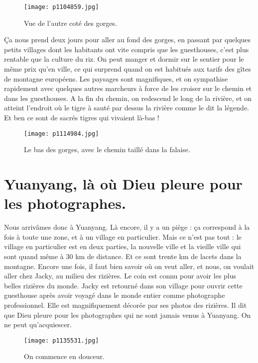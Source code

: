 \documentclass{book}
\begin{document}
\begin{figure}[h]
\centering
\texttt{[image: p1104859.jpg]}
\caption*{Vue de l'autre coté des gorges.}
\end{figure}

Ça nous prend deux jours pour aller au fond des gorges, en passant par quelques petits villages dont les habitants ont vite compris que les guesthouses, c'est plus rentable que la culture du riz. On peut manger et dormir sur le sentier pour le même prix qu'en ville, ce qui surprend quand on est habitués aux tarifs des gîtes de montagne européens. Les paysages sont magnifiques, et on sympathise rapidement avec quelques autres marcheurs à force de les croiser sur le chemin et dans les guesthouses.
A la fin du chemin, on redescend le long de la rivière, et on atteint l'endroit où le tigre à sauté par dessus la rivière comme le dit la légende. Et ben ce sont de sacrés tigres qui vivaient là-bas !


\begin{figure}[h]
\centering
\texttt{[image: p1114984.jpg]}
\caption*{Le bas des gorges, avec le chemin taillé dans la falaise.}
\end{figure}



\chapter{Yuanyang, là où Dieu pleure pour les photographes.}
Nous arrivâmes donc à Yuanyang. Là encore, il y a un piège : ça correspond à la fois à toute une zone, et à un village en particulier. Mais ce n'est pas tout : le village en particulier est en deux parties, la nouvelle ville et la vieille ville qui sont quand même à 30 km de distance. Et ce sont trente km de lacets dans la montagne. Encore une fois, il faut bien savoir où on veut aller, et nous, on voulait aller chez Jacky, au milieu des rizières. Le coin est connu pour avoir les plus belles rizières du monde. Jacky est retourné dans son village pour ouvrir cette guesthouse après avoir voyagé dans le monde entier comme photographe professionnel. Elle est magnifiquement décorée par ses photos des rizières. Il dit que Dieu pleure pour les photographes qui ne sont jamais venus à Yuanyang. On ne peut qu'acquiescer.


\begin{figure}[h]
\centering
\texttt{[image: p1135531.jpg]}
\caption*{On commence en douceur.}
\end{figure}
\end{document}
